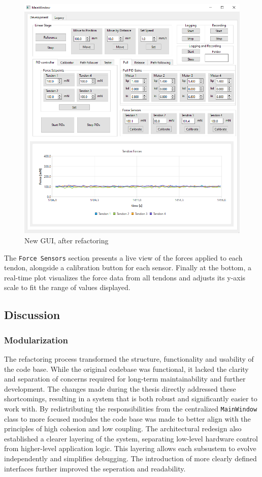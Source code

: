 \begin{figure} [H]
    \centering
    \includegraphics[width=0.85\linewidth]{images/gui/main.PNG}
    \caption{New GUI, after refactoring}
    \label{fig:gui}
\end{figure}
The \texttt{Force Sensors} section presents a live view of the forces applied to each tendon, alongside a calibration button for each sensor. Finally at the bottom, a real-time plot visualizes the force data from all tendons and adjusts its y-axis scale to fit the range of values displayed.


\subsection{Discussion}
\subsubsection{Modularization}
The refactoring process transformed the structure, functionality and usability of the code base. While the original codebase was functional, it lacked the clarity and separation of concerns required for long-term maintainability and further development. The changes made during the thesis directly addressed these shortcomings, resulting in a system that is both robust and significantly easier to work with.
\newline \newline
By redistributing the responsibilities from the centralized \texttt{MainWindow} class to more focused modules the code base was made to better align with the principles of high cohesion and low coupling. The architectural redesign also established a clearer layering of the system, separating low-level hardware control from higher-level application logic. This layering allows each subsustem to evolve independently and simplifies debugging. The introduction of more clearly defined interfaces further improved the seperation and readability.

